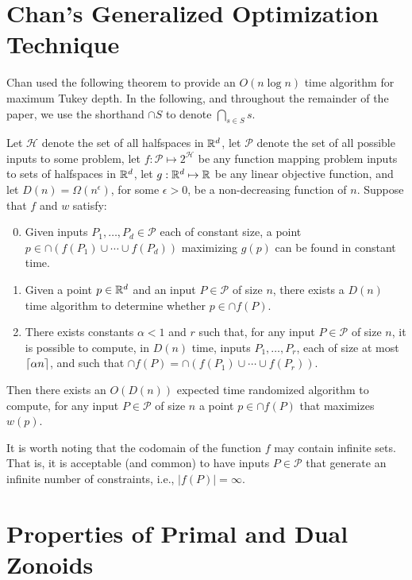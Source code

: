 \documentclass[lotsofwhite]{patmorin}
\begin{document}
\section{Chan's Generalized Optimization Technique}

Chan \cite{c2004} used the following theorem to provide an $O(n\log
n)$ time algorithm for maximum Tukey depth.  In the following, and
throughout the remainder of the paper, we use the shorthand $\cap S$
to denote $\bigcap_{s\in S}s$.

\begin{thm}[Chan 2004]
Let $\mathcal{H}$ denote the set of all halfspaces in $\mathbb{R}^d$,
let $\mathcal{P}$ denote the set of all possible inputs to some problem, 
let $f:\mathcal{P}\mapsto 2^{\mathcal{H}}$ be any function mapping 
problem inputs to sets of halfspaces in $\mathbb{R}^d$,
let $g:\mathbb{R}^d\mapsto \mathbb{R}$ be
any linear objective function, 
and let $D(n)=\Omega(n^{\epsilon})$, for some $\epsilon>0$, be a non-decreasing function of
$n$.  Suppose that $f$ and $w$ satisfy:
\begin{enumerate}
\setcounter{enumi}{-1}
\item Given inputs $P_1,\ldots,P_d\in\mathcal{P}$ each of constant
size, a point $p\in\cap (f(P_1)\cup\cdots\cup f(P_d))$ maximizing
$g(p)$ can be found in constant time.

\item Given a point $p\in\mathbb{R}^d$ and an input $P\in\mathcal{P}$
of size $n$, there exists a $D(n)$ time algorithm to determine whether
$p\in\cap f(P)$.

\item There exists constants $\alpha < 1$ and $r$ such that, for any
input $P\in\mathcal{P}$ of size $n$, it is possible to compute, in
$D(n)$ time, inputs $P_1,\ldots,P_r$, each of size at most
$\left\lceil \alpha n \right\rceil$, and such that $\cap f(P) =
\cap(f(P_1)\cup\cdots\cup f(P_r))$.

\end{enumerate}
Then there exists an $O(D(n))$ expected time randomized algorithm to
compute, for any input $P\in\mathcal{P}$ of size $n$ a point
$p\in\cap f(P)$ that maximizes $w(p)$.
\end{thm}

It is worth noting that the codomain of the function $f$ may contain
infinite sets.  That is, it is acceptable (and common) to have inputs
$P\in\mathcal{P}$ that generate an infinite number of constraints,
i.e., $|f(P)|=\infty$.


\section{Properties of Primal and Dual Zonoids}
\end{document}
